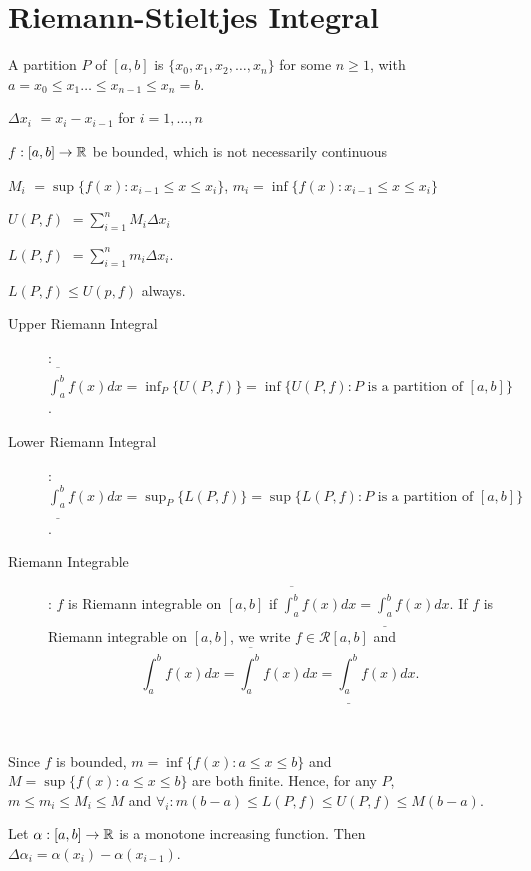 \chapter{Riemann-Stieltjes Integral}
\begin{define}[Partition]
	A partition $P$ of $[a,b]$ is $\{x_0,x_1,x_2,\ldots ,x_{n}\}$ for some $n\ge 1$, with $a=x_0\le x_1 \ldots \le x_{n-1}\le x_{n}=b$.\\
	\begin{notation}
		\begin{describe}
			\item[$\Delta x_i$]$=x_i-x_{i-1}$ for $i=1,\ldots ,n$
			\item[$f$]$: [a,b]\to \mathbb{R}$ be bounded, which is not necessarily continuous
			\item[$M_i$]$=\sup\{f(x):x_{i-1}\le x\le x_i\}$, $m_i=\inf\{f(x):x_{i-1}\le x\le x_i\}$
			\item[$U(P,f)$]$=\sum_{i=1}^{n}{M_i \Delta x_i}$
			\item[$L(P,f)$]$=\sum_{i=1}^{n}{m_{i}\Delta x_{i}}$.
		\end{describe}
	\end{notation}
	\begin{note}
		$L(P,f)\le U(p,f)$ always.
	\end{note}
\end{define}

\begin{define}
	\begin{description}
		\item[Upper Riemann Integral]: $\overline{\int_{a}^{b}}f(x)dx=\inf_{P}\{ U(P,f)\}=\inf\{U(P,f):P\text{ is a partition of }[a,b]\}$.
		\item[Lower Riemann Integral]: $\underline{\int_{a}^{b}}f(x)dx=\sup_{P}\{L(P,f)\} =\sup\{L(P,f):P\text{ is a partition of }[a,b]\}$.
		\item[Riemann Integrable]: $f$ is Riemann integrable on $[a,b]$ if $\overline{\int_{a}^{b}}f(x)dx=\underline{\int_{a}^{b}}f(x)dx$.
		      If $f$ is Riemann integrable on $[a,b]$, we write $f \in \mathscr{R}[a,b]$ and
		      \[
			      \int_{a}^{b}f(x)dx=\overline{\int_{a}^{b}}f(x)dx=\underline{\int_{a}^{b}}f(x)dx.
		      \]

	\end{description}\hfill\\
	\begin{note}
		Since $f$ is bounded, $m=\inf\{f(x):a\le x\le b\}$ and $M=\sup\{f(x):a\le x\le b\}$ are both finite. Hence, for any $P$, $m\le m_i\le M_i\le M$ and $\forall_{i}: m(b-a)\le L(P,f)\le U(P,f)\le M(b-a)$.
	\end{note}
\end{define}
\hfill
\begin{notation}
	Let $\alpha:[a,b]\to \mathbb{R}$ is a monotone increasing function.
	Then $\Delta \alpha_i=\alpha(x_{i})-\alpha(x_{i-1})$.
\end{notation}

